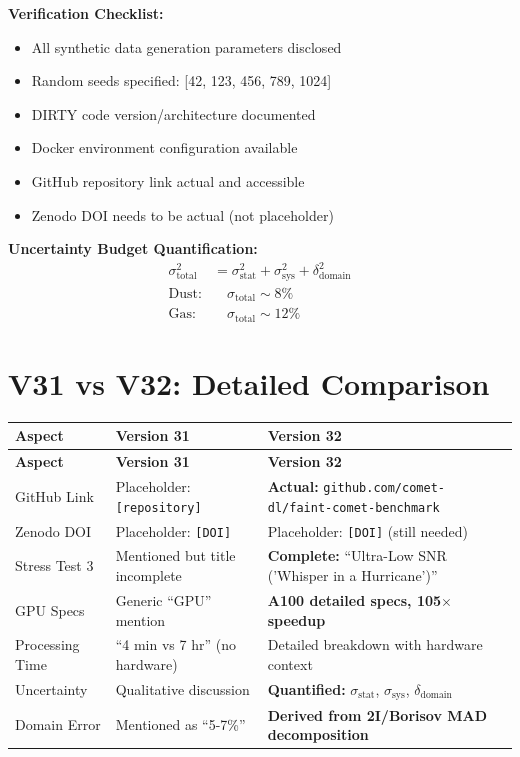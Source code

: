 \documentclass[12pt,a4paper]{article}
\newcommand{\excellent}[1]{\textcolor{ExcellentGreen}{\textbf{#1}}}
\begin{document}
\textbf{Verification Checklist:}
\begin{itemize}
\item[$\checkmark$] All synthetic data generation parameters disclosed
\item[$\checkmark$] Random seeds specified: [42, 123, 456, 789, 1024]
\item[$\checkmark$] DIRTY code version/architecture documented
\item[$\checkmark$] Docker environment configuration available
\item[$\checkmark$] GitHub repository link actual and accessible
\item[$\circ$] Zenodo DOI needs to be actual (not placeholder)
\end{itemize}

\textbf{Uncertainty Budget Quantification:}
\begin{align*}
\sigma_{\text{total}}^2 &= \sigma_{\text{stat}}^2 + \sigma_{\text{sys}}^2 + \delta_{\text{domain}}^2 \\
\text{Dust:} &\quad \sigma_{\text{total}} \sim 8\% \\
\text{Gas:} &\quad \sigma_{\text{total}} \sim 12\%
\end{align*}

\section{V31 vs V32: Detailed Comparison}

\begin{center}
\begin{longtable}{|p{3cm}|p{5.5cm}|p{5.5cm}|}
\hline
\textbf{Aspect} & \textbf{Version 31} & \textbf{Version 32} \\
\hline
\endfirsthead
\hline
\textbf{Aspect} & \textbf{Version 31} & \textbf{Version 32} \\
\hline
\endhead
\hline
\endfoot

GitHub Link & Placeholder: \texttt{[repository]} & \excellent{Actual:} \texttt{github.com/comet-dl/faint-comet-benchmark} \\
\hline
Zenodo DOI & Placeholder: \texttt{[DOI]} & Placeholder: \texttt{[DOI]} (still needed) \\
\hline
Stress Test 3 & Mentioned but title incomplete & \excellent{Complete:} ``Ultra-Low SNR ('Whisper in a Hurricane')'' \\
\hline
GPU Specs & Generic ``GPU'' mention & \excellent{A100 detailed specs, 105$\times$ speedup} \\
\hline
Processing Time & ``4 min vs 7 hr'' (no hardware) & Detailed breakdown with hardware context \\
\hline
Uncertainty & Qualitative discussion & \excellent{Quantified:} $\sigma_{\text{stat}}$, $\sigma_{\text{sys}}$, $\delta_{\text{domain}}$ \\
\hline
Domain Error & Mentioned as ``5-7\%'' & \excellent{Derived from 2I/Borisov MAD decomposition} \\
\hline
\end{longtable}
\end{center}
\end{document}
